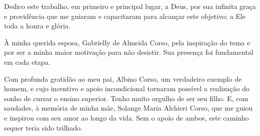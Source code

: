 \begin{dedicatoria}
 \vspace*{\fill}
 \noindent
  \raggedleft
 \begin{minipage}{.54\textwidth}
    Dedico este trabalho, em primeiro e principal lugar, a Deus, por sua infinita graça e providência que me guiaram e capacitaram para alcançar este objetivo; a Ele toda a honra e glória.

    À minha querida esposa, Gabrielly de Almeida Corso, pela inspiração do tema e por ser a minha maior motivação para não desistir. Sua presença foi fundamental em cada etapa.
    
    Com profunda gratidão ao meu pai, Albino Corso, um verdadeiro exemplo de homem, e cujo incentivo e apoio incondicional tornaram possível a realização do sonho de cursar o ensino superior. Tenho muito orgulho de ser seu filho. E, com saudades, à memória de minha mãe, Solange Maria Alchieri Corso, que me guiou e inspirou com seu amor ao longo da vida. Sem o apoio de ambos, este caminho sequer teria sido trilhado.
   \end{minipage}
\end{dedicatoria}
